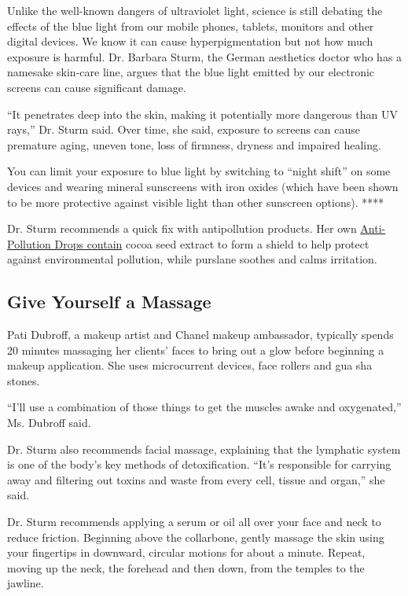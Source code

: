 Unlike the well-known dangers of ultraviolet light, science is still
debating the effects of the blue light from our mobile phones, tablets,
monitors and other digital devices. We know it can cause
hyperpigmentation but not how much exposure is harmful. Dr. Barbara
Sturm, the German aesthetics doctor who has a namesake skin-care line,
argues that the blue light emitted by our electronic screens can cause
significant damage.

``It penetrates deep into the skin, making it potentially more dangerous
than UV rays,'' Dr. Sturm said. Over time, she said, exposure to screens
can cause premature aging, uneven tone, loss of firmness, dryness and
impaired healing.

You can limit your exposure to blue light by switching to ``night
shift'' on some devices and wearing mineral sunscreens with iron oxides
(which have been shown to be more protective against visible light than
other sunscreen options). ****

Dr. Sturm recommends a quick fix with antipollution products. Her own
\href{https://www.drsturm.com/anti-pollution-drops/?gclid=EAIaIQobChMIz8Ltwt-a6wIVE4nICh1UywhyEAQYASABEgK-qvD_BwE}{Anti-Pollution
Drops contain} cocoa seed extract to form a shield to help protect
against environmental pollution, while purslane soothes and calms
irritation.

\hypertarget{give-yourself-a-massage}{%
\subsection{Give Yourself a Massage}\label{give-yourself-a-massage}}

Pati Dubroff, a makeup artist and Chanel makeup ambassador, typically
spends 20 minutes massaging her clients' faces to bring out a glow
before beginning a makeup application. She uses microcurrent devices,
face rollers and gua sha stones.

``I'll use a combination of those things to get the muscles awake and
oxygenated,'' Ms. Dubroff said.

Dr. Sturm also recommends facial massage, explaining that the lymphatic
system is one of the body's key methods of detoxification. ``It's
responsible for carrying away and filtering out toxins and waste from
every cell, tissue and organ,'' she said.

Dr. Sturm recommends applying a serum or oil all over your face and neck
to reduce friction. Beginning above the collarbone, gently massage the
skin using your fingertips in downward, circular motions for about a
minute. Repeat, moving up the neck, the forehead and then down, from the
temples to the jawline.

